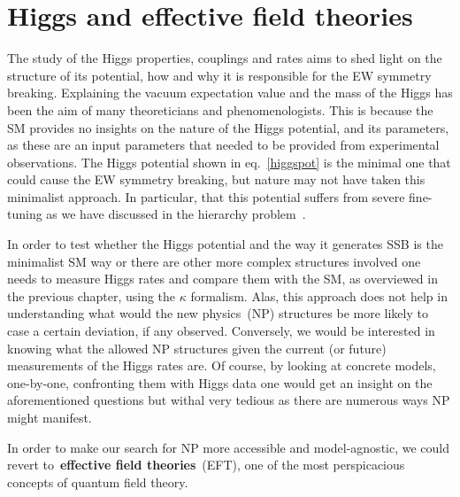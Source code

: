 \chapter{Higgs and effective field theories }\label{chap:HiggsEFT}
\par The study of the Higgs properties, couplings and rates aims to shed light on the structure of its potential, how and why it is responsible for the EW symmetry breaking. Explaining the vacuum expectation value and the mass of the Higgs has been the aim of many theoreticians and phenomenologists. This is because the SM provides no insights on the nature of the Higgs potential, and its parameters, as these are an input parameters that needed to be provided from experimental observations. The Higgs potential shown in eq.~\eqref{higgspot} is the minimal one that could cause the EW symmetry breaking, but nature may not have taken this minimalist approach. In particular, that this potential suffers from severe fine-tuning as we have discussed in the hierarchy problem~.
\par  In order to test whether the Higgs potential and the way it generates SSB is the minimalist SM way or there are other more complex structures involved one needs to measure Higgs rates and compare them with the SM, as overviewed in the previous chapter, using the $\kappa$ formalism. Alas, this approach does not help in understanding what would the new physics~(NP) structures be more likely to case a certain deviation, if any observed. Conversely, we would be interested in knowing what the allowed NP structures given the current (or future) measurements of the Higgs rates are.  Of course, by looking at concrete models, one-by-one,  confronting them with Higgs data one would get an insight on the aforementioned questions but withal very tedious as there are numerous ways NP might manifest. 
\par In order to make our search for NP more accessible and model-agnostic, we could revert to~\textbf{effective field theories}~(EFT), one of the most perspicacious concepts of quantum field theory. 

